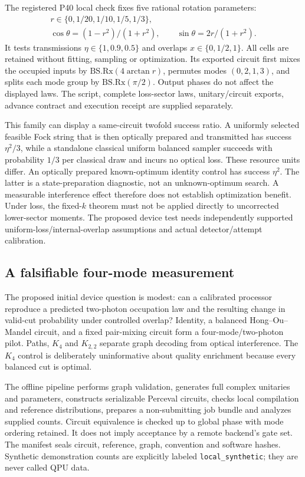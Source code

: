 The registered P40 local check fixes five rational rotation parameters:
\begin{gather*}
 r\in\{0,1/20,1/10,1/5,1/3\},\\
 \cos\theta=(1-r^2)/(1+r^2),\qquad \sin\theta=2r/(1+r^2).
\end{gather*}
It tests transmissions $\eta\in\{1,0.9,0.5\}$ and overlaps $x\in\{0,1/2,1\}$. All \CalibrationCellCount{} cells are retained without fitting, sampling or optimization. Its exported circuit first mixes the occupied inputs by $\mathrm{BS.Rx}(4\arctan r)$, permutes modes $(0,2,1,3)$, and splits each mode group by $\mathrm{BS.Rx}(\pi/2)$. Output phases do not affect the displayed laws. The script, complete loss-sector laws, unitary/circuit exports, advance contract and execution receipt are supplied separately.

This family can display a same-circuit twofold success ratio. A uniformly selected feasible Fock string that is then optically prepared and transmitted has success $\eta^2/3$, while a standalone classical uniform balanced sampler succeeds with probability $1/3$ per classical draw and incurs no optical loss. These resource units differ. An optically prepared known-optimum identity control has success $\eta^2$. The latter is a state-preparation diagnostic, not an unknown-optimum search. A measurable interference effect therefore does not establish optimization benefit. Under loss, the fixed-$k$ theorem must not be applied directly to uncorrected lower-sector moments. The proposed device test needs independently supported uniform-loss/internal-overlap assumptions and actual detector/attempt calibration.

\subsection{A falsifiable four-mode measurement}
The proposed initial device question is modest: can a calibrated processor reproduce a predicted two-photon occupation law and the resulting change in valid-cut probability under controlled overlap? Identity, a balanced Hong--Ou--Mandel circuit, and a fixed pair-mixing circuit form a four-mode/two-photon pilot. Paths, $K_4$ and $K_{2,2}$ separate graph decoding from optical interference. The $K_4$ control is deliberately uninformative about quality enrichment because every balanced cut is optimal.

The offline pipeline performs graph validation, generates full complex unitaries and parameters, constructs serializable Perceval circuits, checks local compilation and reference distributions, prepares a non-submitting job bundle and analyzes supplied counts. Circuit equivalence is checked up to global phase with mode ordering retained. It does not imply acceptance by a remote backend's gate set. The manifest seals circuit, reference, graph, convention and software hashes. Synthetic demonstration counts are explicitly labeled \texttt{local\_synthetic}; they are never called QPU data.

